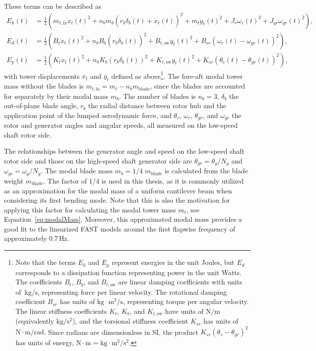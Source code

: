 %
These terms can be described as
\begin{align*}
    E_k(t) & = \frac{1}{2}\left(m_{t,\text{fa}}\dot{x}_t(t)^2 + n_b m_b(r_b\dot{\delta}_b(t) + \dot{x}_t(t))^2 + m_t\dot{y}_t(t)^2 + J_r\omega_r(t)^2 + J_{gr}\omega_{gr}(t)^2\right),\\
    E_d(t)  & = \frac{1}{2}\left(B_t\dot{x}_t(t)^2 + n_b B_b(r_b\dot{\delta}_b(t))^2 + B_{t,\text{sw}}\dot{y}_t(t)^2 + B_{sr}(\omega_r(t) - \omega_{gr}(t))^2\right),\\
    E_p(t)  & = \frac{1}{2}\left(K_t{x}_t(t)^2 + n_b K_b(r_b{\delta}_b(t))^2 + K_{t,\text{sw}}{y}_t(t)^2 + K_{sr}(\theta_r(t) - \theta_{gr}(t))^2\right),
\end{align*}
with tower displacements \(x_t\) and \(y_t\) defined as above\footnote{Note that the terms \(E_k\) and \(E_p\) represent energies in the unit Joules, but \(E_d\) corresponds to a dissipation function representing power in the unit Watts. The coefficients \(B_t\), \(B_b\), and \(B_{t,\text{sw}}\) are linear damping coefficients with units of~\(\text{kg}/\text{s}\), representing force per linear velocity. The rotational damping coefficient \(B_{sr}\) has units of \(\text{kg}\cdot \text{m}^2/\text{s}\), representing torque per angular velocity. The linear stiffness coefficients \(K_t\), \(K_b\), and \(K_{t,\text{sw}}\) have units of \(\text{N}/\text{m}\) (equivalently \(\text{kg}/\text{s}^2\)), and the torsional stiffness coefficient \(K_{sr}\) has units of \(\text{N}\cdot\text{m}/\text{rad}\). Since radians are dimensionless in SI, the product \(K_{sr}(\theta_r - \theta_{gr})^2\) has units of energy, \( \text{N}\cdot\text{m} =\text{kg} \cdot \text{m}^2 / \text{s}^2\).}. The fore-aft modal tower mass without the blades is $m_{t,\text{fa}} = m_t - n_b m_{\text{blade}}$, since the blades are accounted for separately by their modal mass $m_b$. The number of blades is $n_b=3$, \(\delta_b\) the out-of-plane blade angle, $r_b$ the radial distance between rotor hub and the application point of the lumped aerodynamic force, and \(\theta_r\), \(\omega_r\), \(\theta_{gr}\), and \(\omega_{gr}\) the rotor and generator angles and angular speeds, all measured on the low-speed shaft rotor side.

The relationships between the generator angle and speed on the low-speed shaft rotor side and those on the high-speed shaft generator side are $\theta_{gr} = \theta_{g}/N_g$ and  $\omega_{gr} = \omega_{g}/N_g$. The modal blade mass $m_b = 1/4\; m_{\text{blade}}$ is calculated from the blade weight $m_{\text{blade}}$. The factor of 1/4 is used in this thesis, as it is commonly utilized as an approximation for the modal mass of a uniform cantilever beam when considering its first bending mode. Note that this is also the motivation for applying this factor for calculating the modal tower mass $m_t$, see Equation~\eqref{eq:modalMass}. Moreover, this approximated modal mass provides a good fit to the linearized FAST models around the first flapwise frequency of approximately 0.7\,Hz. 

